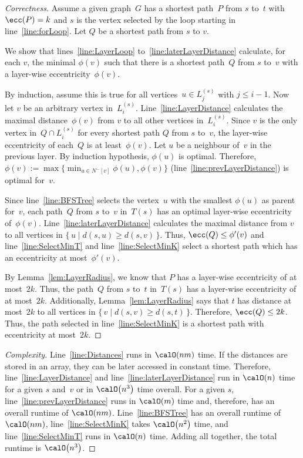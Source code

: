 \begin{proof}
    [Correctness]
Assume a given graph~$G$ has a shortest path~$P$ from $s$ to~$t$ with $\ecc(P) = k$ and $s$ is the vertex selected by the loop starting in line~\ref{line:forLoop}.
Let $Q$ be a shortest path from $s$ to $v$.

We show that lines~\ref{line:LayerLoop} to~\ref{line:laterLayerDistance} calculate, for each $v$, the minimal $\phi(v)$ such that there is a shortest path~$Q$ from $s$ to~$v$ with a layer-wise eccentricity~$\phi(v)$.

By induction, assume this is true for all vertices~$u \in L_j^{(s)}$ with $j \leq i -1$.
Now let $v$ be an arbitrary vertex in~$L_i^{(s)}$.
Line~\ref{line:LayerDistance} calculates the maximal distance~$\phi(v)$ from $v$ to all other vertices in~$L_i^{(s)}$.
Since $v$ is the only vertex in~$Q \cap L_i^{(s)}$ for every shortest path $Q$ from $s$ to~$v$, the layer-wise eccentricity of each~$Q$ is at least~$\phi(v)$.
Let $u$ be a neighbour of~$v$ in the previous layer.
By induction hypothesis, $\phi(u)$ is optimal.
Therefore, $\phi(v) := \max \Big \{ \min_{u \in N^-[v]}\phi(u), \phi(v) \Big \}$ (line~\ref{line:prevLayerDistance}) is optimal for~$v$.

Since line~\ref{line:BFSTree} selects the vertex~$u$ with the smallest $\phi(u)$ as parent for~$v$, each path~$Q$ from $s$ to~$v$ in~$T(s)$ has an optimal layer-wise eccentricity of~$\phi(v)$.
Line~\ref{line:laterLayerDistance} calculates the maximal distance from $v$ to all vertices in $\big \{ \, u \mid d(s,u) \geq d(s,v) \, \big \}$.
Thus, $\ecc(Q) \leq \phi'(v)$ and line~\ref{line:SelectMinT} and line~\ref{line:SelectMinK} select a shortest path which has an eccentricity at most~$\phi'(v)$.

By Lemma~\ref{lem:LayerRadius}, we know that $P$ has a layer-wise eccentricity of at most~$2k$.
Thus, the path~$Q$ from $s$ to~$t$ in~$T(s)$ has a layer-wise eccentricity of at most~$2k$.
Additionally, Lemma~\ref{lem:LayerRadius} says that $t$ has distance at most~$2k$ to all vertices in $\{ \, v \mid d(s,v) \geq d(s,t) \, \}$.
Therefore, $\ecc(Q) \leq 2k$.
Thus, the path selected in line~\ref{line:SelectMinK} is a shortest path with eccentricity at most~$2k$.
\end{proof}

\begin{proof}
    [Complexity]
Line~\ref{line:Distances} runs in $\calO(nm)$ time.
If the distances are stored in an array, they can be later accessed in constant time.
Therefore, line~\ref{line:LayerDistance} and line~\ref{line:laterLayerDistance} run in $\calO(n)$ time for a given $s$ and~$v$ or in $\calO \big( n^3 \big)$ time overall.
For a given $s$, line~\ref{line:prevLayerDistance} runs in $\calO(m)$ time and, therefore, has an overall runtime of $\calO(nm)$.
Line~\ref{line:BFSTree} has an overall runtime of $\calO(nm)$, line~\ref{line:SelectMinK} takes $\calO \big( n^2 \big)$ time, and line~\ref{line:SelectMinT} runs in $\calO(n)$ time.
Adding all together, the total runtime is $\calO \big( n^3 \big)$.
\end{proof}

